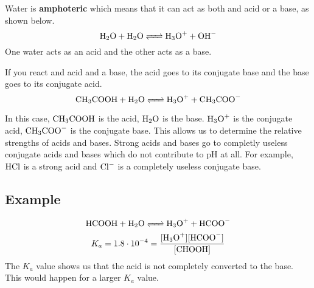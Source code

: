 \documentclass{article}
\begin{document}
Water is \textbf{amphoteric} which means that it can act as both and acid or a
base, as shown below.
$$\ce{H_2O + H_2O <=> H_3O+ + OH-}$$
One water acts as an acid and the other acts as a base.

If you react and acid and a base, the acid goes to its conjugate base and the
base goes to its conjugate acid.
$$\ce{CH_3COOH + H_2O <=> H_3O+ + CH_3COO-}$$

In this case, $\ce{CH_3COOH}$ is the acid, $\ce{H_2O}$ is the base. $\ce{H_3O+}$
is the conjugate acid, $\ce{CH_3COO-}$ is the conjugate base. This allows us to
determine the relative strengths of acids and bases. Strong acids and bases go
to completly useless conjugate acids and bases which do not contribute to pH at
all. For example, $\ce{HCl}$ is a strong acid and $\ce{Cl-}$ is a completely
useless conjugate base.

\subsection{Example}
$$\ce{HCOOH + H_2O <=> H_3O+ + HCOO-}$$
$$K_a=1.8\cdot10^{-4}=\frac{[\ce{H_3O+}][\ce{HCOO-}]}{[\ce{CHOOH}]}$$
The $K_a$ value shows us that the acid is not completely converted to the base.
This would happen for a larger $K_a$ value.
\end{document}
